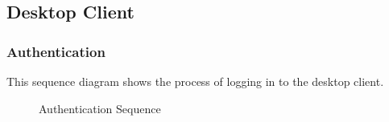 \subsection{Desktop Client}

\subsubsection{Authentication}
This sequence diagram shows the process of logging in to the desktop client.
\begin{figure}[hb]
    \centering
    \caption{Authentication Sequence}
    \label{fig:seq-desktop-auth}
\end{figure}


